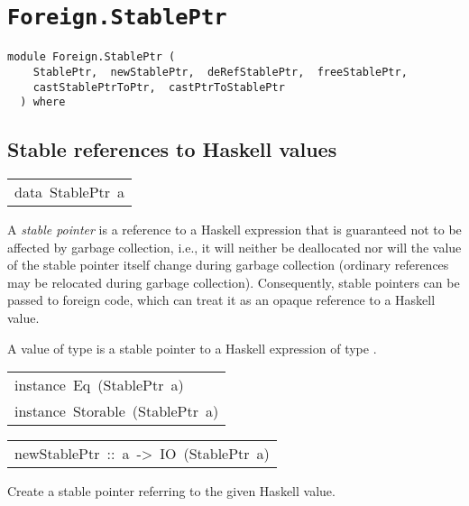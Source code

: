 \chapter{\texttt{Foreign.StablePtr}}
\label{module:Foreign.StablePtr}
\haddockbeginheader
{\haddockverb\begin{verbatim}
module Foreign.StablePtr (
    StablePtr,  newStablePtr,  deRefStablePtr,  freeStablePtr, 
    castStablePtrToPtr,  castPtrToStablePtr
  ) where\end{verbatim}}
\haddockendheader

\section{Stable references to Haskell values
}
\begin{haddockdesc}
\item[\begin{tabular}{@{}l}
data\ StablePtr\ a
\end{tabular}]\haddockbegindoc
A \emph{stable pointer} is a reference to a Haskell expression that is
guaranteed not to be affected by garbage collection, i.e., it will neither be
deallocated nor will the value of the stable pointer itself change during
garbage collection (ordinary references may be relocated during garbage
collection).  Consequently, stable pointers can be passed to foreign code,
which can treat it as an opaque reference to a Haskell value.
\par
A value of type  is a stable pointer to a Haskell
expression of type .
\par

\end{haddockdesc}
\begin{haddockdesc}
\item[\begin{tabular}{@{}l}
instance\ Eq\ (StablePtr\ a)\\instance\ Storable\ (StablePtr\ a)
\end{tabular}]
\end{haddockdesc}
\begin{haddockdesc}
\item[\begin{tabular}{@{}l}
newStablePtr\ ::\ a\ ->\ IO\ (StablePtr\ a)
\end{tabular}]\haddockbegindoc
Create a stable pointer referring to the given Haskell value.
\par

\end{haddockdesc}
